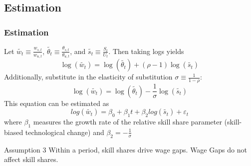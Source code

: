 \documentclass[11pt]{beamer} \usetheme{Frankfurt}
\begin{document}
\subsection{Estimation}
\begin{frame}
  \frametitle{Estimation}
  Let $\tilde{w_{t}}\equiv \frac{w_{s,t}}{w_{u,t}}$,
  $\tilde{\theta_{t}}\equiv \frac{\theta_{s,t}}{\theta_{u,t}}$, and
  $\tilde{s_{t}}\equiv \frac{S_{t}}{U_{t}}$. Then taking logs yields
  \begin{equation}
    \label{eq:4}
    \log(\tilde{w_{t}}) = \log(\tilde{\theta_{t}}) + (\rho-1)\log(\tilde{s_{t}})
  \end{equation}
  Additionally, substitute in the elasticity of substitution
  $\sigma \equiv \frac{1}{1-\rho}$:
  \begin{equation}
    \label{eq:5}
    \log(\tilde{w_{t}}) = \log(\tilde{\theta_{t}}) - \frac{1}{\sigma}\log(\tilde{s_{t}})
  \end{equation}
  This equation can be estimated as
  \begin{equation}
    \label{eq:6}
    log(\tilde{w_{t}})=\beta_{0}+\beta_{1}t+\beta_{2}log(\tilde{s_{t}})+\varepsilon_{t}
  \end{equation}
  where $\beta_{1}$ measures the growth rate of the relative skill
  share parameter (skill-biased technological change) and
  $\beta_{2}=-\frac{1}{\sigma}$
  \begin{block}{Assumption 3}
    Within a period, skill shares drive wage gaps. Wage Gaps do not
    affect skill shares.
  \end{block}
\end{frame}
\end{document}
